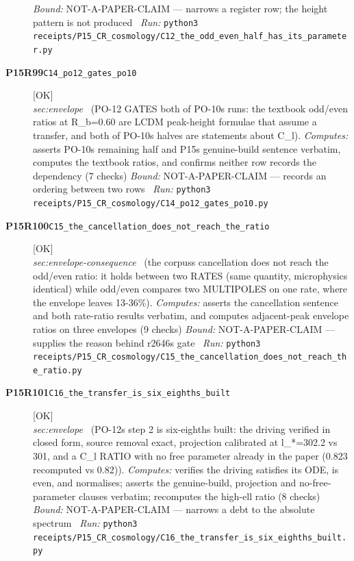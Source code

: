 \begin{description}
 \emph{Bound:} NOT-A-PAPER-CLAIM --- narrows a register row; the height pattern is not produced
\ \emph{Run:} \texttt{python3 receipts/P15\_CR\_cosmology/C12\_the\_odd\_even\_half\_has\_its\_parameter.py}
\item[\rcptlabel{C14_po12_gates_po10}{P15R99}\textbf{P15R99}\quad\texttt{C14\_po12\_gates\_po10}]\hfill\textsf{[OK]}\\
\textit{sec:envelope} \ (PO-12 GATES both of PO-10s runs: the textbook odd/even ratios at R\_b=0.60 are LCDM peak-height formulae that assume a transfer, and both of PO-10s halves are statements about C\_l). 
\emph{Computes:} asserts PO-10s remaining half and P15s genuine-build sentence verbatim, computes the textbook ratios, and confirms neither row records the dependency (7 checks)
 \emph{Bound:} NOT-A-PAPER-CLAIM --- records an ordering between two rows
\ \emph{Run:} \texttt{python3 receipts/P15\_CR\_cosmology/C14\_po12\_gates\_po10.py}
\item[\rcptlabel{C15_the_cancellation_does_not_reach_the_ratio}{P15R100}\textbf{P15R100}\quad\texttt{C15\_the\_cancellation\_does\_not\_reach\_the\_ratio}]\hfill\textsf{[OK]}\\
\textit{sec:envelope-consequence} \ (the corpuss cancellation does not reach the odd/even ratio: it holds between two RATES (same quantity, microphysics identical) while odd/even compares two MULTIPOLES on one rate, where the envelope leaves 13-36\%). 
\emph{Computes:} asserts the cancellation sentence and both rate-ratio results verbatim, and computes adjacent-peak envelope ratios on three envelopes (9 checks)
 \emph{Bound:} NOT-A-PAPER-CLAIM --- supplies the reason behind r2646s gate
\ \emph{Run:} \texttt{python3 receipts/P15\_CR\_cosmology/C15\_the\_cancellation\_does\_not\_reach\_the\_ratio.py}
\item[\rcptlabel{C16_the_transfer_is_six_eighths_built}{P15R101}\textbf{P15R101}\quad\texttt{C16\_the\_transfer\_is\_six\_eighths\_built}]\hfill\textsf{[OK]}\\
\textit{sec:envelope} \ (PO-12s step 2 is six-eighths built: the driving verified in closed form, source removal exact, projection calibrated at l\_*=302.2 vs 301, and a C\_l RATIO with no free parameter already in the paper (0.823 recomputed vs 0.82)). 
\emph{Computes:} verifies the driving satisfies its ODE, is even, and normalises; asserts the genuine-build, projection and no-free-parameter clauses verbatim; recomputes the high-ell ratio (8 checks)
 \emph{Bound:} NOT-A-PAPER-CLAIM --- narrows a debt to the absolute spectrum
\ \emph{Run:} \texttt{python3 receipts/P15\_CR\_cosmology/C16\_the\_transfer\_is\_six\_eighths\_built.py}

\end{description}
